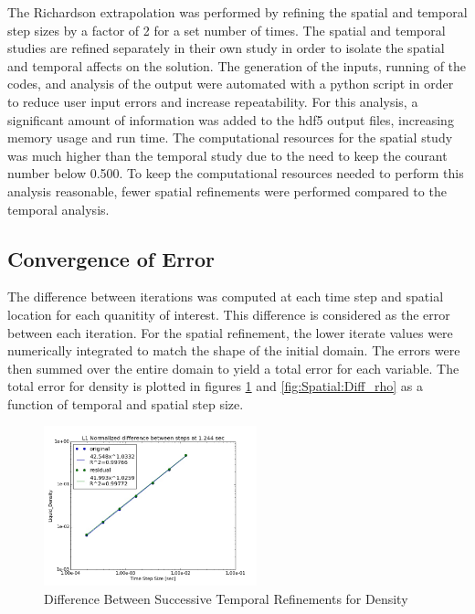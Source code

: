 \documentclass{mc2015}
\begin{document}
The Richardson extrapolation was performed by refining the spatial and temporal
step sizes by a factor of 2 for a set number of times. The spatial and temporal
studies are refined separately in their own study in order to isolate the
spatial and temporal affects on the solution. The generation of the inputs,
running of the codes, and analysis of the output were automated with a python
script in order to reduce user input errors and increase repeatability.  For
this analysis, a significant amount of information was added to the hdf5 output
files, increasing memory usage and run time. The computational resources for the
spatial study was much higher than the temporal study due to the need to keep
the courant number below 0.500. To keep the computational resources needed
to perform this analysis reasonable, fewer spatial refinements were performed
compared to the temporal analysis.

\subsection{Convergence of Error}

The difference between iterations was computed at each time step and spatial
location for each quanitity of interest. This difference is considered as the
error between each iteration. For the spatial refinement, the lower iterate
values were numerically integrated to match the shape of the initial domain. The
errors were then summed over the entire domain to yield a total error for each
variable. The total error for density is plotted in figures
\ref{fig:Temporal:Diff_rho} and \ref{fig:Spatial:Diff_rho} as a function of
temporal and spatial step size.

\begin{figure}[!h]
	\centering
	\includegraphics[width=0.55\textwidth]{images/Temporal_Study/Difference_rho}
	\caption{Difference Between Successive Temporal Refinements for Density}
	\label{fig:Temporal:Diff_rho}
\end{figure} 
\end{document}
